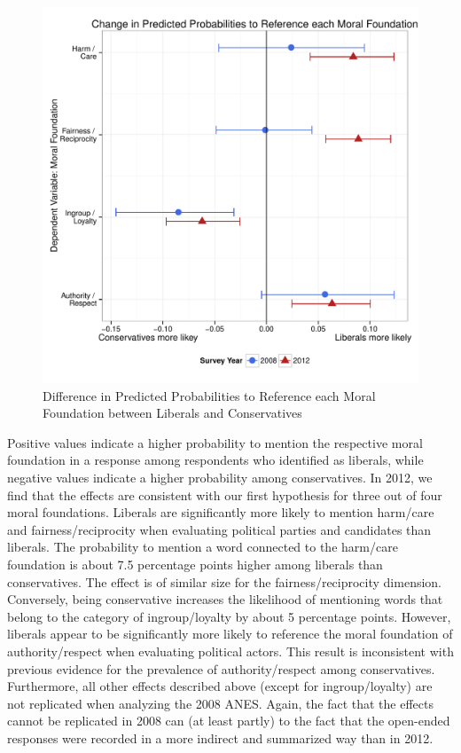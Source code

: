 \documentclass[12pt]{article}
\begin{document}
\begin{figure}\centering
\includegraphics[scale=.5]{../calc/fig/m1_mft.pdf}
\caption{Difference in Predicted Probabilities to Reference each Moral Foundation between Liberals and Conservatives}\label{fig:m1_mft}
\end{figure}

Positive values indicate a higher probability to mention the respective moral foundation in a response among respondents who identified as liberals, while negative values indicate a higher probability among conservatives. In 2012, we find that the effects are consistent with our first hypothesis for three out of four moral foundations. Liberals are significantly more likely to mention harm/care and fairness/reciprocity when evaluating political parties and candidates than liberals. The probability to mention a word connected to the harm/care foundation is about 7.5 percentage points higher among liberals than conservatives. The effect is of similar size for the fairness/reciprocity dimension. Conversely, being conservative increases the likelihood of mentioning words that belong to the category of ingroup/loyalty by about 5 percentage points. However, liberals appear to be significantly more likely to reference the moral foundation of authority/respect when evaluating political actors. This result is inconsistent with previous evidence for the prevalence of authority/respect among conservatives. Furthermore, all other effects described above (except for ingroup/loyalty) are not replicated when analyzing the 2008 ANES. Again, the fact that the effects cannot be replicated in 2008 can (at least partly) to the fact that the open-ended responses were recorded in a more indirect and summarized way than in 2012.
\end{document}
